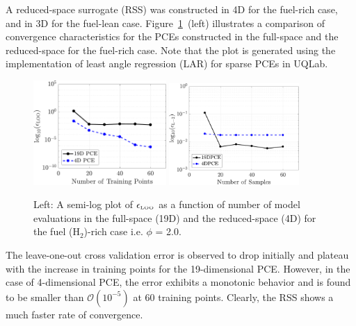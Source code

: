 A reduced-space surrogate (RSS) was constructed in 4D for the fuel-rich case,
and in 3D for
the fuel-lean case. Figure~\ref{fig:err_samples_kinetics}~(left) illustrates a
comparison of convergence characteristics for the PCEs constructed in the
full-space and the reduced-space for the fuel-rich case. Note that the
plot is generated using the implementation of least angle regression (LAR)
for sparse PCEs in UQLab.  
%
\begin{figure}[htbp]
 \begin{center}
  \includegraphics[width=0.45\textwidth]{./Figures/err_samples_kinetics}
   \includegraphics[width=0.44\textwidth]{./Figures/errL2_samples_kinetics}
\caption{Left: A semi-log plot of $\epsilon_\text{\tiny LOO}$ as a function of
number of model evaluations in the full-space (19D) and the reduced-space (4D)
for the fuel (H$_2$)-rich case i.e. $\phi$ = 2.0. }
\label{fig:err_samples_kinetics}
\end{center}
\end{figure}
%
The leave-one-out cross validation error is observed to drop initially
and plateau with the increase in training points for the 19-dimensional
PCE. However, in the case of 4-dimensional PCE, the error exhibits a
monotonic behavior and is found to be smaller than $\mathcal{O}(10^{-5})$
at 60 training points. Clearly, the RSS shows a much faster rate of convergence.

